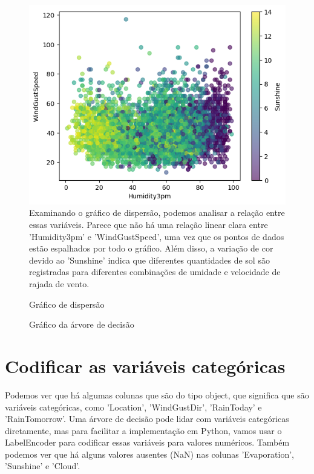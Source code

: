 \documentclass{article}
\begin{document}
\begin{figure}
\includegraphics[width=1\textwidth]{Humidity3pm-WindGustSpeed-Sunshine.png}
Examinando o gráfico de dispersão, podemos analisar a relação entre essas variáveis. Parece que não há uma relação linear clara entre 'Humidity3pm' e 'WindGustSpeed', uma vez que os pontos de dados estão espalhados por todo o gráfico. Além disso, a variação de cor devido ao 'Sunshine' indica que diferentes quantidades de sol são registradas para diferentes combinações de umidade e velocidade de rajada de vento.
\caption{Gráfico de dispersão}
\end{figure}

\begin{figure}

\caption{Gráfico da árvore de decisão}
\end{figure}

\section{Codificar as variáveis categóricas}

Podemos ver que há algumas colunas que são do tipo object, que significa que são variáveis categóricas, como 'Location', 'WindGustDir', 'RainToday' e 'RainTomorrow'. Uma árvore de decisão pode lidar com variáveis categóricas diretamente, mas para facilitar a implementação em Python, vamos usar o LabelEncoder para codificar essas variáveis para valores numéricos. Também podemos ver que há alguns valores ausentes (NaN) nas colunas 'Evaporation', 'Sunshine' e 'Cloud'.
\end{document}
